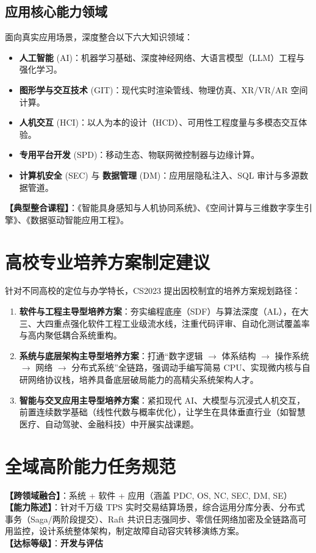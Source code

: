\subsection{应用核心能力领域}
面向真实应用场景，深度整合以下六大知识领域：
\begin{itemize}
    \item \textbf{人工智能} (AI)：机器学习基础、深度神经网络、大语言模型（LLM）工程与强化学习。
    \item \textbf{图形学与交互技术} (GIT)：现代实时渲染管线、物理仿真、XR/VR/AR 空间计算。
    \item \textbf{人机交互} (HCI)：以人为本的设计（HCD）、可用性工程度量与多模态交互体验。
    \item \textbf{专用平台开发} (SPD)：移动生态、物联网微控制器与边缘计算。
    \item \textbf{计算机安全} (SEC) 与 \textbf{数据管理} (DM)：应用层隐私注入、SQL 审计与多源数据管道。
\end{itemize}
\textbf{【典型整合课程】}：《智能具身感知与人机协同系统》、《空间计算与三维数字孪生引擎》、《数据驱动智能应用工程》。

\section{高校专业培养方案制定建议}

针对不同高校的定位与办学特长，CS2023 提出因校制宜的培养方案规划路径：
\begin{enumerate}
    \item \textbf{软件与工程主导型培养方案}：夯实编程底座（SDF）与算法深度（AL），在大三、大四重点强化软件工程工业级流水线，注重代码评审、自动化测试覆盖率与高内聚低耦合系统重构。
    \item \textbf{系统与底层架构主导型培养方案}：打通“数字逻辑 $\to$ 体系结构 $\to$ 操作系统 $\to$ 网络 $\to$ 分布式系统”全链路，强调动手编写简易 CPU、实现微内核与自研网络协议栈，培养具备底层破局能力的高精尖系统架构人才。
    \item \textbf{智能与交叉应用主导型培养方案}：紧扣现代 AI、大模型与沉浸式人机交互，前置连续数学基础（线性代数与概率优化），让学生在具体垂直行业（如智慧医疗、自动驾驶、金融科技）中开展实战课题。
\end{enumerate}

\section{全域高阶能力任务规范}

\begin{taskbox}
\textbf{【跨领域融合】}：系统 + 软件 + 应用（涵盖 PDC, OS, NC, SEC, DM, SE）\\
\textbf{【能力陈述】}：针对千万级 TPS 实时交易结算场景，综合运用分库分表、分布式事务（Saga/两阶段提交）、Raft 共识日志强同步、零信任网络加密及全链路高可用监控，设计系统整体架构，制定故障自动容灾转移演练方案。\\
\textbf{【达标等级】}：\textbf{开发与评估}
\end{taskbox}


